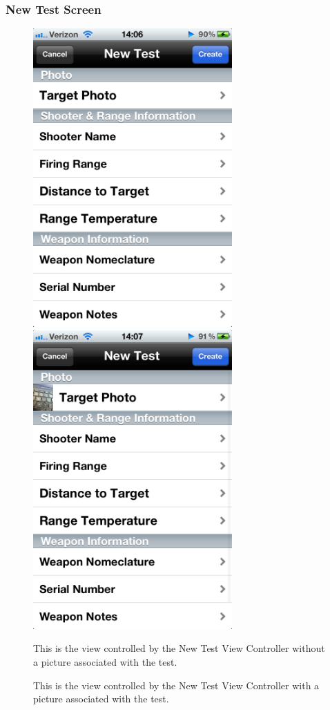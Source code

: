 \newpage
\subsubsection{New Test Screen}
\begin{figure}[H!htb]
\includegraphics[width=3in]{ScreenShots111011/NewTest.png}
\includegraphics[width=3in]{ScreenShots111011/NewTestPhoto.png}
\begin{minipage}{0.5\linewidth}
\caption{This is the view controlled by the New Test View Controller without a picture associated with the test.}
\end{minipage}
\begin{minipage}{0.5\linewidth}
\caption{This is the view controlled by the New Test View Controller with a picture associated with the test.}
\end{minipage}
\end{figure}

